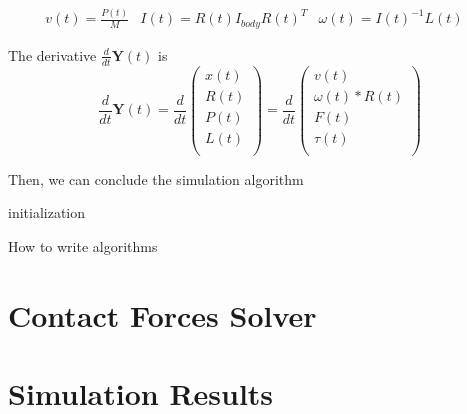 \begin{align*}
    v(t) = \frac{P(t)}{M} & 
    I(t) = R(t)I_{body}R(t)^{T} &
    \omega(t) = I(t)^{-1}L(t) &
\end{align*}

The derivative $\frac{d}{dt}\textbf{Y}(t)$ is
\begin{equation}
    \frac{d}{dt}\textbf{Y}(t) = \frac{d}{dt}\left(
        \begin{array}{c}
            x(t) \\
            R(t) \\
            P(t) \\
            L(t) \\
        \end{array}
    \right) = \frac{d}{dt}\left(
        \begin{array}{c}
            v(t) \\
            \omega(t)*R(t) \\
            F(t) \\
            \tau(t) \\
        \end{array}
    \right)
\end{equation}

Then, we can conclude the simulation algorithm 

\begin{algorithm}[H]
 initialization\;
 \caption{How to write algorithms}
\end{algorithm}


\section{Contact Forces Solver}

\section{Simulation Results}